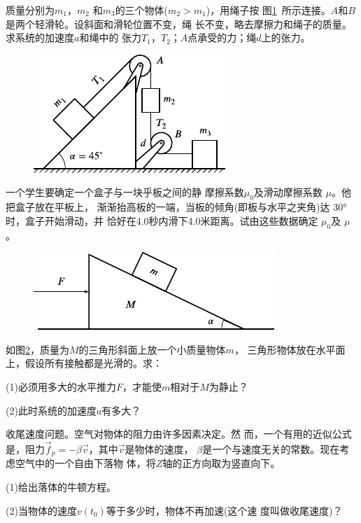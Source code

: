 \begin{exercises}
\exercise 质量分别为$ m_1 $，$  m _ { 2 } $ 和$ m_3 $的三个物体($ m _ { 2 } > m _ { 1 } $)，用绳子按
图\ref{fig:03.28}~所示连接。$ A $和$  B  $是两个轻滑轮。设斜面和滑轮位置不变，绳
长不变，略去摩擦力和绳子的质量。求系统的加速度$ a $和绳中的
张力$  T _ { 1 }  $，$  T _ { 2 }  $；$ A  $点承受的力；绳$ d $上的张力。

\begin{figure}
  \centering
  \includegraphics{figure/fig03.28}
  \caption{}
  \label{fig:03.28}
\end{figure}
\exercise 一个学生要确定一个盒子与一块乎板之间的静
摩擦系数$ \mu _ 0 $及滑动摩擦系数 $\mu$。他把盒子放在平板上，
渐渐抬高板的一端，当板的倾角(即板与水平之夹角)达
\ang{30}时，盒子开始滑动，并
恰好在4.0秒内滑下4.0米距离。试由这些数据确定 $\mu_0$及 $\mu$。

\begin{figure}
  \centering
  \includegraphics{figure/fig03.29}
  \caption{}
  \label{fig:03.29}
\end{figure}
\exercise 如图\ref{fig:03.29}，质量为$ M $的三角形斜面上放一个小质量物体$ m $，
三角形物体放在水平面上，假设所有接触都是光滑的。求：

(1)必须用多大的水平推力$ F $，才能使$ m $相对于$ M $为静止？

(2)此时系统的加速度$ a $有多大？

\exercise 收尾速度问题。空气对物体的阻力由许多因素决定。然
而，一个有用的近似公式是，阻力$  \vec{f} _ { p } = - \beta \vec{v}  $，其中$\vec{v}$是物体的速度，
$\beta$是一个与速度无关的常数。现在考虑空气中的一个自由下落物
体，将$ Z $轴的正方向取为竖直向下。

(1)给出落体的牛顿方程。

(2)当物体的速度$  v( t _ 0)  $等于多少时，物体不再加速(这个速
度叫做收尾速度)？


\end{exercises}
